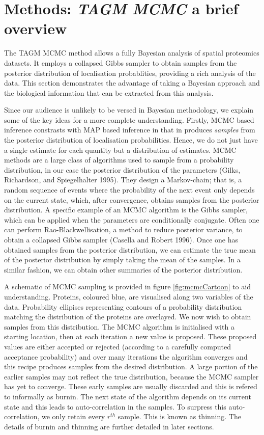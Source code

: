 \documentclass[]{article}
\begin{document}
\section{\texorpdfstring{Methods: \emph{TAGM MCMC} a brief
overview}{Methods: TAGM MCMC a brief overview}}\label{methods-tagm-mcmc-a-brief-overview}

The TAGM MCMC method allows a fully Bayesian analysis of spatial
proteomics datasets. It employs a collapsed Gibbs sampler to obtain
samples from the posterior distribution of localisation probablities,
providing a rich analysis of the data. This section demonstrates the
advantage of taking a Bayesian approach and the biological information
that can be extracted from this analysis.

Since our audience is unlikely to be versed in Bayesian methodology, we
explain some of the key ideas for a more complete understanding.
Firstly, MCMC based inference constrasts with MAP based inference in
that in produces \textit{samples} from the posterior distribution of
localisation probabilities. Hence, we do not just have a single estimate
for each quantity but a distribution of estimates. MCMC methods are a
large class of algorithms used to sample from a probability
distribution, in our case the posterior distribution of the parameters
(Gilks, Richardson, and Spiegelhalter 1995). They design a Markov-chain;
that is, a random sequence of events where the probability of the next
event only depends on the current state, which, after convergence,
obtains samples from the posterior distribution. A specific example of
an MCMC algorithm is the Gibbs sampler, which can be applied when the
parameters are conditionally conjugate. Often one can perform
Rao-Blackwellisation, a method to reduce posterior variance, to obtain a
collapsed Gibbs sampler (Casella and Robert 1996). Once one has obtained
samples from the posterior distribution, we can estimate the true mean
of the posterior distribution by simply taking the mean of the samples.
In a similar fashion, we can obtain other summaries of the posterior
distribution.

A schematic of MCMC sampling is provided in figure \ref{fig:mcmcCartoon}
to aid understanding. Proteins, coloured blue, are visualised along two
variables of the data. Probability ellipises representing contours of a
probability distribution matching the distribution of the proteins are
overlayed. We now wish to obtain samples from this distribution. The
MCMC algorithm is initialised with a starting location, then at each
iteration a new value is proposed. These proposed values are either
accepted or rejected (according to a carefully computed acceptance
probability) and over many iterations the algorithm converges and this
recipe produces samples from the desired distribution. A large portion
of the earlier samples may not reflect the true distribution, because
the MCMC sampler has yet to converge. These early samples are usually
discarded and this is refered to informally as burnin. The next state of
the algorithm depends on its current state and this leads to
auto-correlation in the samples. To surpress this auto-correlation, we
only retain every \(r^{th}\) sample. This is known as thinning. The
details of burnin and thinning are further detailed in later sections.
\end{document}
